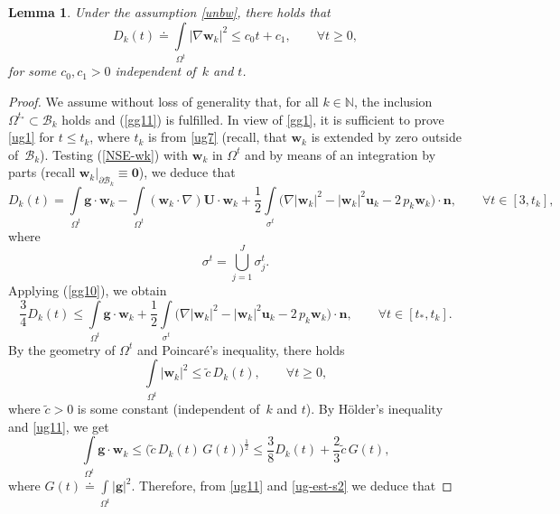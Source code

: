 \documentclass[11pt]{article}
\newtheorem{lemma}[theorem]{Lemma}
\numberwithin{equation}{section}
\numberwithin{figure}{section}
\newcommand{\N}{\mathbb{N}}
\def\N{{\mathbb N}}
\def\ue{{\mathbf u}}
\def\cc{{\tilde c}}
\def\n{{\mathbf n}}
\def\0{{\mathbf 0}}
\def\OO{{\Omega}}
\def\we{{\mathbf w}}
\begin{document}
\begin{lemma} \label{lem:61} Under the assumption \eqref{unbw}, there holds that
\begin{equation}\label{ug1}
D_k(t) \doteq\int\limits_{\Omega^t }|\nabla\we_k|^2\le c_0t+c_1, \qquad \forall t\ge0,
\end{equation}
for some $c_0, c_1>0$ independent of~$k$ and $t$.
\end{lemma}
\begin{proof} 
We assume without loss of generality that, for all $k\in\N$, the inclusion $\Omega^{t_*} \subset  \mathcal{B}_k$ holds and (\ref{gg11}) is fulfilled. In view of \eqref{gg1}, it is sufficient to prove \eqref{ug1}
for $t \le t_k$, where $t_k$ is from \eqref{ug7} (recall, that $\we_k$ is extended by zero outside of~$\mathcal{B}_k$). Testing (\ref{NSE-wk}) with $\we_k$ in
$\Omega^{t}$ and by means of an integration by parts (recall $\we_k|_{\partial  \mathcal{B}_k}\equiv\0$), we deduce that
	\begin{equation}\label{ug9}D_k(t)=\int\limits_{\OO^t}\mathbf{g}\cdot\we_k-\int\limits_{\OO^t}(\mathbf{w}_k \cdot \nabla) \mathbf{U}\cdot\we_k+\frac12\int\limits_{\sigma^t}\biggl( \nabla |\we_k|^2-|\we_k|^2\ue_k-2\,p_k\we_k \biggr)\cdot\n,\qquad \forall  t \in [3, t_k],
	\end{equation}
	where
	\begin{equation}\label{ug10}\sigma^t=\bigcup\limits_{j=1}^J\sigma^t_j.
	\end{equation}
	Applying (\ref{gg10}), we obtain
	\begin{equation}\label{ug11}
		\frac34D_k(t)\le\int\limits_{\OO^t}\mathbf{g}\cdot\we_k+\frac12\int\limits_{\sigma^t}\biggl(\nabla |\we_k|^2-|\we_k|^2\ue_k-2\,p_k\we_k\biggr)\cdot\n,\qquad \forall t \in [t_*, t_k].
	\end{equation}
	By the geometry of $\Omega^t$ and Poincar\'e's inequality, there holds
	\begin{equation}\label{ug-est-s1}\int\limits_{\OO^t}|\we_k|^2\le \cc\, D_k(t),\qquad\forall t\ge 0,\end{equation}
	where $\cc>0$ is some constant (independent of~$k$ and $t$). By H\"older's inequality and \eqref{ug11}, we get
	\begin{equation}\label{ug-est-s2}
		\int\limits_{\OO^t}\mathbf{g}\cdot\we_k\le \biggl(\tilde c\,D_k(t)\,G(t)\biggr)^\frac12\le \frac38 D_k(t)+\frac23\cc\,G(t),\end{equation}
	where $G(t)\doteq\int\limits_{\OO^t}|\mathbf{g}|^2$.
	Therefore, from \eqref{ug11} and \eqref{ug-est-s2} we deduce that

\end{proof}
\end{document}

